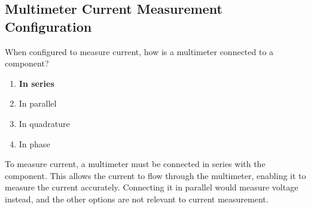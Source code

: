 \subsection{Multimeter Current Measurement Configuration}
\label{T7D03}

\begin{tcolorbox}[colback=gray!10!white,colframe=black!75!black,title=T7D03]
When configured to measure current, how is a multimeter connected to a component?
\begin{enumerate}[noitemsep]
    \item \textbf{In series}
    \item In parallel
    \item In quadrature
    \item In phase
\end{enumerate}
\end{tcolorbox}

To measure current, a multimeter must be connected in series with the component. This allows the current to flow through the multimeter, enabling it to measure the current accurately. Connecting it in parallel would measure voltage instead, and the other options are not relevant to current measurement.